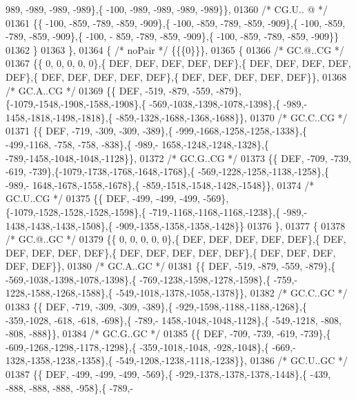 \begin{DoxyCode}
      989, -989, -989, -989\},\{ -100, -989, -989, -989, -989\}\},
01360 \textcolor{comment}{/* CG.U.. @ */}
01361 \{\{ -100, -859, -789, -859, -909\},\{ -100, -859, -789, -859, -909\},\{ -100, -859, -789, -859, -909\},\{ -100, -
      859, -789, -859, -909\},\{ -100, -859, -789, -859, -909\}\}
01362 \}
01363 \},
01364 \{ \textcolor{comment}{/* noPair */} \{\{\{0\}\}\},
01365 \{
01366 \textcolor{comment}{/* GC.@..CG */}
01367 \{\{    0,    0,    0,    0,    0\},\{  DEF,  DEF,  DEF,  DEF,  DEF\},\{  DEF,  DEF,  DEF,  DEF,  DEF\},\{  DEF,  
      DEF,  DEF,  DEF,  DEF\},\{  DEF,  DEF,  DEF,  DEF,  DEF\}\},
01368 \textcolor{comment}{/* GC.A..CG */}
01369 \{\{  DEF, -519, -879, -559, -879\},\{-1079,-1548,-1908,-1588,-1908\},\{ -569,-1038,-1398,-1078,-1398\},\{ -989,-
      1458,-1818,-1498,-1818\},\{ -859,-1328,-1688,-1368,-1688\}\},
01370 \textcolor{comment}{/* GC.C..CG */}
01371 \{\{  DEF, -719, -309, -309, -389\},\{ -999,-1668,-1258,-1258,-1338\},\{ -499,-1168, -758, -758, -838\},\{ -989,-
      1658,-1248,-1248,-1328\},\{ -789,-1458,-1048,-1048,-1128\}\},
01372 \textcolor{comment}{/* GC.G..CG */}
01373 \{\{  DEF, -709, -739, -619, -739\},\{-1079,-1738,-1768,-1648,-1768\},\{ -569,-1228,-1258,-1138,-1258\},\{ -989,-
      1648,-1678,-1558,-1678\},\{ -859,-1518,-1548,-1428,-1548\}\},
01374 \textcolor{comment}{/* GC.U..CG */}
01375 \{\{  DEF, -499, -499, -499, -569\},\{-1079,-1528,-1528,-1528,-1598\},\{ -719,-1168,-1168,-1168,-1238\},\{ -989,-
      1438,-1438,-1438,-1508\},\{ -909,-1358,-1358,-1358,-1428\}\}
01376 \},
01377 \{
01378 \textcolor{comment}{/* GC.@..GC */}
01379 \{\{    0,    0,    0,    0,    0\},\{  DEF,  DEF,  DEF,  DEF,  DEF\},\{  DEF,  DEF,  DEF,  DEF,  DEF\},\{  DEF,  
      DEF,  DEF,  DEF,  DEF\},\{  DEF,  DEF,  DEF,  DEF,  DEF\}\},
01380 \textcolor{comment}{/* GC.A..GC */}
01381 \{\{  DEF, -519, -879, -559, -879\},\{ -569,-1038,-1398,-1078,-1398\},\{ -769,-1238,-1598,-1278,-1598\},\{ -759,-
      1228,-1588,-1268,-1588\},\{ -549,-1018,-1378,-1058,-1378\}\},
01382 \textcolor{comment}{/* GC.C..GC */}
01383 \{\{  DEF, -719, -309, -309, -389\},\{ -929,-1598,-1188,-1188,-1268\},\{ -359,-1028, -618, -618, -698\},\{ -789,-
      1458,-1048,-1048,-1128\},\{ -549,-1218, -808, -808, -888\}\},
01384 \textcolor{comment}{/* GC.G..GC */}
01385 \{\{  DEF, -709, -739, -619, -739\},\{ -609,-1268,-1298,-1178,-1298\},\{ -359,-1018,-1048, -928,-1048\},\{ -669,-
      1328,-1358,-1238,-1358\},\{ -549,-1208,-1238,-1118,-1238\}\},
01386 \textcolor{comment}{/* GC.U..GC */}
01387 \{\{  DEF, -499, -499, -499, -569\},\{ -929,-1378,-1378,-1378,-1448\},\{ -439, -888, -888, -888, -958\},\{ -789,-

\end{DoxyCode}
